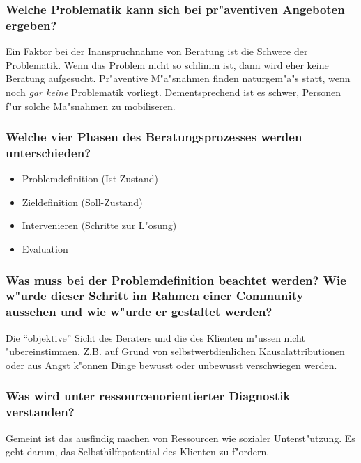 \subsubsection{Welche Problematik kann sich bei pr"aventiven Angeboten ergeben?}
Ein Faktor bei der Inanspruchnahme von Beratung ist die Schwere der Problematik. Wenn das Problem nicht so schlimm ist, dann wird eher keine Beratung aufgesucht. Pr"aventive M"a"snahmen finden naturgem"a"s statt, wenn noch \emph{gar keine} Problematik vorliegt. Dementsprechend ist es schwer, Personen f"ur solche Ma"snahmen zu mobiliseren. 

\subsubsection{Welche vier Phasen des Beratungsprozesses werden unterschieden?}
\begin{itemize}
        \item Problemdefinition (Ist-Zustand)
        \item Zieldefinition (Soll-Zustand)
        \item Intervenieren (Schritte zur L"osung)
        \item Evaluation
\end{itemize}

\subsubsection{Was muss bei der Problemdefinition beachtet werden? Wie w"urde dieser Schritt im Rahmen einer Community aussehen und wie w"urde er gestaltet werden?}
Die ``objektive'' Sicht des Beraters und die des Klienten m"ussen nicht "ubereinstimmen. Z.B. auf Grund von selbstwertdienlichen Kausalattributionen oder aus Angst k"onnen Dinge bewusst oder unbewusst verschwiegen werden. 

\subsubsection{Was wird unter ressourcenorientierter Diagnostik verstanden?}
Gemeint ist das ausfindig machen von Ressourcen wie sozialer Unterst"utzung. Es geht darum, das Selbsthilfepotential des Klienten zu f"ordern.

